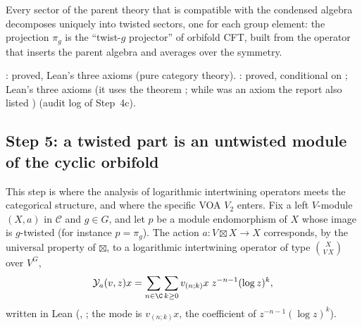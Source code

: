 \begin{physics}
Every sector of the parent theory that is compatible with the condensed algebra decomposes uniquely into twisted sectors,
one for each group element: the projection $\pi_g$ is the ``twist-$g$ projector'' of orbifold CFT, built from the
operator that inserts the parent algebra and averages over the symmetry.
\end{physics}

\begin{status}
: proved, Lean's three axioms (pure category theory). : proved, conditional on
; Lean's three axioms (it uses the theorem ; while  was an axiom the report also listed ) (audit log of Step~4c).
\end{status}

\subsection{Step 5: a twisted part is an untwisted module of the cyclic orbifold}

This step is where the analysis of logarithmic intertwining operators meets the categorical structure, and where the
specific VOA $V_2$ enters. Fix a left $V$-module $(X,a)$ in $\mathcal C$ and $g\in G$, and let $p$ be a module
endomorphism of $X$ whose image is $g$-twisted (for instance $p=\pi_g$). The action $a:V\boxtimes X\to X$ corresponds,
by the universal property of $\boxtimes$, to a logarithmic intertwining operator of type $\binom{X}{V\,X}$ over $V^G$,
\begin{equation*}
  \mathcal Y_a(v,z)x=\sum_{n\in\C}\sum_{k\ge0}v_{(n;k)}x\;z^{-n-1}(\log z)^k ,
\end{equation*}
written  in Lean (, ; the mode
 is $v_{(n;k)}x$, the coefficient of $z^{-n-1}(\log z)^k$).

